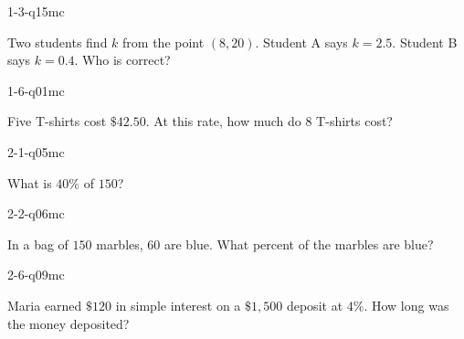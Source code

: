 
\begin{practiceQuestion}{1-3-q15}{mc}
\begin{questionText}
Two students find $k$ from the point $(8, 20)$. Student A says $k = 2.5$. Student B says $k = 0.4$. Who is correct?
\end{questionText}
\end{practiceQuestion}

\begin{practiceQuestion}{1-6-q01}{mc}
\begin{questionText}
Five T-shirts cost $\$42.50$. At this rate, how much do $8$ T-shirts cost?
\end{questionText}
\end{practiceQuestion}

\begin{practiceQuestion}{2-1-q05}{mc}
\begin{questionText}
What is $40\%$ of $150$?
\end{questionText}
\end{practiceQuestion}

\begin{practiceQuestion}{2-2-q06}{mc}
\begin{questionText}
In a bag of $150$ marbles, $60$ are blue. What percent of the marbles are blue?
\end{questionText}
\end{practiceQuestion}

\begin{practiceQuestion}{2-6-q09}{mc}
\begin{questionText}
Maria earned $\$120$ in simple interest on a $\$1{,}500$ deposit at $4\%$. How long was the money deposited?
\end{questionText}
\end{practiceQuestion}

